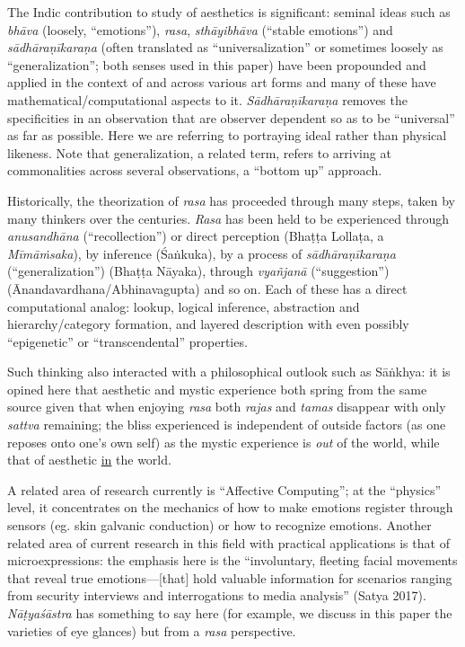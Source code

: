 The Indic contribution to study of aesthetics is significant: seminal ideas such as \textsl{bhāva} (loosely, “emotions”), \textsl{rasa}, \textsl{sthāyibhāva} (“stable emotions”) and \textsl{sādhāraṇīkaraṇa} (often translated as “universalization” or sometimes loosely as “generalization”; both senses used in this paper) have been propounded and applied in the context of and across various art forms and many of these have mathematical/computational aspects to it. \textsl{Sādhāraṇīkaraṇa} removes the specificities in an observation that are observer dependent so as to be “universal” as far as possible. Here we are referring to portraying ideal rather than physical likeness. Note that generalization, a related term, refers to arriving at commonalities across several observations, a “bottom up” approach.

Historically, the theorization of \textsl{rasa} has proceeded through many steps, taken by many thinkers over the centuries. \textsl{Rasa} has been held to be experienced through \textsl{anusandhāna} (“recollection”) or direct perception (Bhaṭṭa Lollaṭa, a \textsl{Mīmāṁsaka}), by inference (Śaṅkuka), by a process of \textsl{sādhāraṇīkaraṇa} (“generalization”) (Bhaṭṭa Nāyaka), through \textsl{vyañjanā} (“suggestion”) (Ānandavardhana/Abhinavagupta) and so on. Each of these has a direct computational analog: lookup, logical inference, abstraction and hierarchy/category formation, and layered description with even possibly “epigenetic” or “transcendental” properties.

Such thinking also interacted with a philosophical outlook such as Sāṅkhya: it is opined here that aesthetic and mystic experience both spring from the same source given that when enjoying \textsl{rasa} both \textsl{rajas} and \textsl{tamas} disappear with only \textsl{sattva} remaining; the bliss experienced is independent of outside factors (as one reposes onto one’s own self) as the mystic experience is \textsl{out} of the world, while that of aesthetic \underline{in} the world.

A related area of research currently is “Affective Computing”; at the “physics” level, it concentrates on the mechanics of how to make emotions register through sensors (eg. skin galvanic conduction) or how to recognize emotions. Another related area of current research in this field with practical applications is that of microexpressions: the emphasis here is the “involuntary, fleeting facial movements that reveal true emotions—[that] hold valuable information for scenarios ranging from security interviews and interrogations to media analysis” (Satya 2017). \textsl{Nāṭyaśāstra} has something to say here (for example, we discuss in this paper the varieties of eye glances) but from a \textsl{rasa} perspective.

